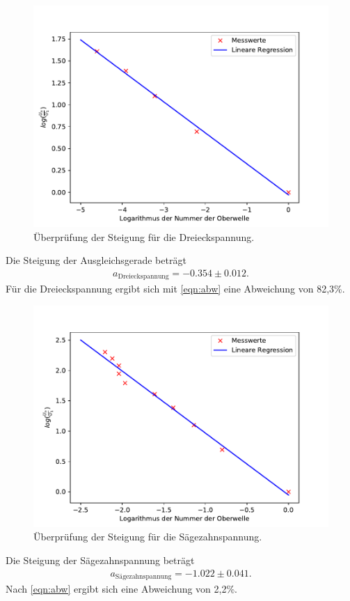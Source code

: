  \begin{figure}[H]
  \centering
  \includegraphics{plot2.pdf}
  \caption{Überprüfung der Steigung für die Dreieckspannung.}
  \label{fig:plot2}
\end{figure}
Die Steigung der Ausgleichsgerade beträgt
\begin{align*}
  a_{\text{Dreieckspannung}}= -0.354 \pm 0.012.
\end{align*}
Für die Dreieckspannung ergibt sich mit \eqref{eqn:abw} eine Abweichung von
82,3\%.
\begin{figure}[H]
  \centering
  \includegraphics{plot3.pdf}
  \caption{Überprüfung der Steigung für die Sägezahnspannung.}
  \label{fig:plot3}
\end{figure}
Die Steigung der Sägezahnspannung beträgt
\begin{align*}
  a_{\text{Sägezahnspannung}}= -1.022 \pm 0.041.
\end{align*}
Nach \eqref{eqn:abw} ergibt sich eine Abweichung von 2,2\%.


